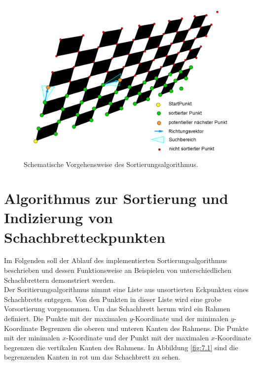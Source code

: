 

\begin{figure}[!htb]
	\centering
	\includegraphics[width=0.8\linewidth]{images/VerzeichnetesSchachbretFunktion.png}
	\caption[Funktionsübersicht des Sortieralgorithmus]{Schematische Vorgehensweise des Sortierungsalgorithmus.}
	\label{fig:UebersichtSortierungsAlg}
\end{figure}




\section{Algorithmus zur Sortierung und Indizierung von Schachbretteckpunkten}

Im Folgenden soll der Ablauf des implementierten Sortierungsalgorithmus beschrieben und dessen Funktionsweise an Beispielen von unterschiedlichen Schachbrettern demonstriert werden.\\

Der Soritierungsalgorithmus nimmt eine Liste aus unsortierten Eckpunkten eines Schachbretts entgegen. Von den Punkten in dieser Liste wird eine grobe Vorsortierung vorgenommen. Um das Schachbrett herum wird ein Rahmen definiert. Die Punkte mit der maximalen $y$-Koordinate und der minimalen $y$-Koordinate Begrenzen die oberen und unteren Kanten des Rahmens. Die Punkte mit der minimalen $x$-Koordinate und der Punkt mit der maximalen $x$-Koordinate begrenzen die vertikalen Kanten des Rahmens. In Abbildung \ref{fig:7.1} sind die begrenzenden Kanten in rot um das Schachbrett zu sehen.\\

